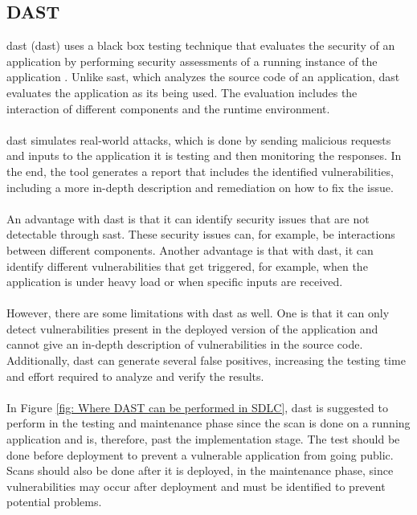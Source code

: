 \subsection{DAST}
\acrlong{dast} (\acrshort{dast}) uses a black box testing technique that evaluates the security of an application by performing security assessments of a running instance of the application \cite{dast}. Unlike \acrshort{sast}, which analyzes the source code of an application, \acrshort{dast} evaluates the application as its being used. The evaluation includes the interaction of different components and the runtime environment. 
\\~\\
\acrshort{dast} simulates real-world attacks, which is done by sending malicious requests and inputs to the application it is testing and then monitoring the responses. In the end, the tool generates a report that includes the identified vulnerabilities, including a more in-depth description and remediation on how to fix the issue. 
\\~\\
An advantage with \acrshort{dast} is that it can identify security issues that are not detectable through \acrshort{sast}. These security issues can, for example, be interactions between different components. Another advantage is that with \acrshort{dast}, it can identify different vulnerabilities that get triggered, for example, when the application is under heavy load or when specific inputs are received.
\\~\\
However, there are some limitations with \acrshort{dast} as well. One is that it can only detect vulnerabilities present in the deployed version of the application and cannot give an in-depth description of vulnerabilities in the source code. Additionally, \acrshort{dast} can generate several false positives, increasing the testing time and effort required to analyze and verify the results. 
\\~\\
In Figure \ref{fig: Where DAST can be performed in SDLC}, \acrshort{dast} is suggested to perform in the testing and maintenance phase since the scan is done on a running application and is, therefore, past the implementation stage. The test should be done before deployment to prevent a vulnerable application from going public. Scans should also be done after it is deployed, in the maintenance phase, since vulnerabilities may occur after deployment and must be identified to prevent potential problems. 

